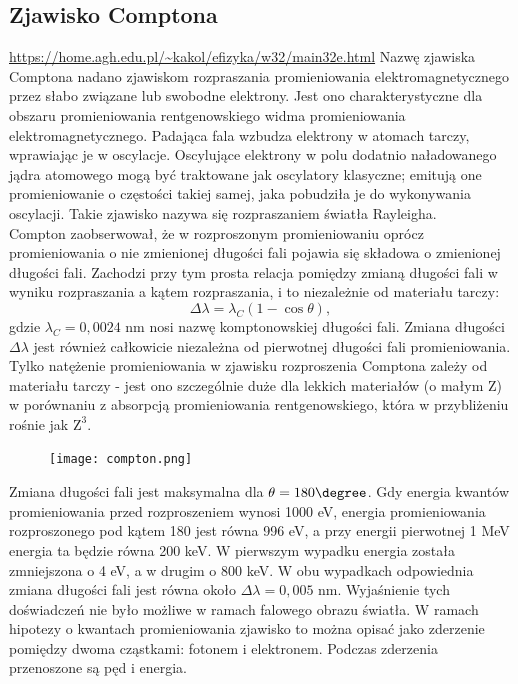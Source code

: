 \documentclass{article}
\begin{document}
\subsection{Zjawisko Comptona}

\url{https://home.agh.edu.pl/~kakol/efizyka/w32/main32e.html}
Nazwę zjawiska Comptona nadano zjawiskom rozpraszania promieniowania elektromagnetycznego przez słabo związane lub swobodne elektrony. Jest ono charakterystyczne dla obszaru promieniowania rentgenowskiego widma promieniowania elektromagnetycznego. Padająca fala wzbudza elektrony w atomach tarczy, wprawiając je w oscylacje. Oscylujące elektrony w polu dodatnio naładowanego jądra atomowego mogą być traktowane jak oscylatory klasyczne; emitują one promieniowanie o częstości takiej samej, jaka pobudziła je do wykonywania oscylacji. Takie zjawisko nazywa się rozpraszaniem światła Rayleigha. \\
Compton zaobserwował, że w rozproszonym promieniowaniu oprócz promieniowania o nie zmienionej długości fali pojawia się składowa o zmienionej długości fali. Zachodzi przy tym prosta relacja pomiędzy zmianą długości fali w wyniku rozpraszania a kątem rozpraszania, i to niezależnie od materiału tarczy:
\begin{equation*}
    \Delta \lambda = \lambda_C(1-\cos \theta),
\end{equation*}
gdzie $\lambda_C=0,0024$ nm nosi nazwę komptonowskiej długości fali. Zmiana długości $\Delta \lambda$ jest również całkowicie niezależna od pierwotnej długości fali promieniowania. Tylko natężenie promieniowania w zjawisku rozproszenia Comptona zależy od materiału tarczy - jest ono szczególnie duże dla lekkich materiałów (o małym Z) w porównaniu z absorpcją promieniowania rentgenowskiego, która w przybliżeniu rośnie jak $\mathrm{Z^3}$. 

\begin{figure}[H]
    \centering
    \texttt{[image: compton.png]}
    \label{fig:compton}
\end{figure}

Zmiana długości fali jest maksymalna dla $\theta=180\degree$. Gdy energia kwantów promieniowania przed rozproszeniem wynosi 1000 eV, energia promieniowania rozproszonego pod kątem 180 \degree jest równa 996 eV, a przy energii pierwotnej 1 MeV energia ta będzie równa 200 keV. W pierwszym wypadku energia została zmniejszona o 4 eV, a w drugim o 800 keV. W obu wypadkach odpowiednia zmiana długości fali jest równa około $\Delta \lambda=0,005$ nm. Wyjaśnienie tych doświadczeń nie było możliwe w ramach falowego obrazu światła. W ramach hipotezy o kwantach promieniowania zjawisko to można opisać jako zderzenie pomiędzy dwoma cząstkami: fotonem i elektronem. Podczas zderzenia przenoszone są pęd i energia. \\
\end{document}

